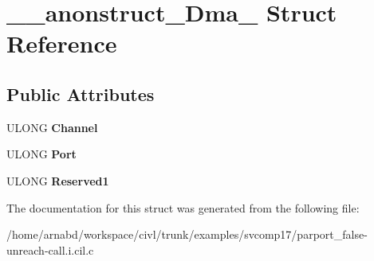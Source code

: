 \hypertarget{struct____anonstruct__Dma__20}{}\section{\+\_\+\+\_\+anonstruct\+\_\+\+Dma\+\_ Struct Reference}
\label{struct____anonstruct__Dma__20}
\subsection*{Public Attributes}
\begin{DoxyCompactItemize}
\item 
\hypertarget{struct____anonstruct__Dma__20_ad214f60d256b6ea84c3bd5b85a843eed}{}U\+L\+O\+N\+G {\bfseries Channel}\label{struct____anonstruct__Dma__20_ad214f60d256b6ea84c3bd5b85a843eed}

\item 
\hypertarget{struct____anonstruct__Dma__20_a189ae6822f4c19dd1f12296d469f688e}{}U\+L\+O\+N\+G {\bfseries Port}\label{struct____anonstruct__Dma__20_a189ae6822f4c19dd1f12296d469f688e}

\item 
\hypertarget{struct____anonstruct__Dma__20_a15d82a458ccebed206d6fe3398c9bc9f}{}U\+L\+O\+N\+G {\bfseries Reserved1}\label{struct____anonstruct__Dma__20_a15d82a458ccebed206d6fe3398c9bc9f}

\end{DoxyCompactItemize}


The documentation for this struct was generated from the following file\+:\begin{DoxyCompactItemize}
\item 
/home/arnabd/workspace/civl/trunk/examples/svcomp17/parport\+\_\+false-\/unreach-\/call.\+i.\+cil.\+c\end{DoxyCompactItemize}
